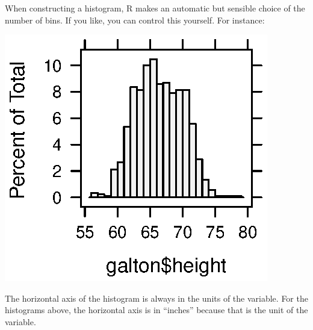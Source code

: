 When constructing a histogram, R makes an automatic but sensible
choice of the number of bins.  If you like, you can control this
yourself.  For instance:
\begin{Schunk}
\end{Schunk}
\includegraphics{Figures/variation-var2-hist}

The  horizontal axis of the histogram is always in the units of the variable.
For the histograms above, the  horizontal axis is in ``inches'' because that
is the unit of the  variable.       %


